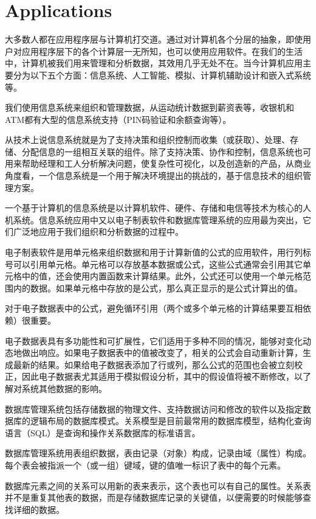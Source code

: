 \part{Applications}

大多数人都在应用程序层与计算机打交道。通过对计算机各个分层的抽象，即使用户对应用程序层下的各个计算层一无所知，也可以使用应用软件。在我们的生活中，计算机被我们用来管理和分析数据，其效用几乎无处不在。当今计算机应用主要分为以下五个方面：信息系统、人工智能、模拟、计算机辅助设计和嵌入式系统等。

我们使用信息系统来组织和管理数据，从运动统计数据到薪资表等，收银机和ATM都有大型的信息系统支持（PIN码验证和余额查询等）。

从技术上说信息系统就是为了支持决策和组织控制而收集（或获取）、处理、存储、分配信息的一组相互关联的组件。除了支持决策、协作和控制，信息系统也可用来帮助经理和工人分析解决问题，使复杂性可视化，以及创造新的产品，从商业角度看，一个信息系统是一个用于解决环境提出的挑战的，基于信息技术的组织管理方案。

一个基于计算机的信息系统是以计算机软件、硬件、存储和电信等技术为核心的人机系统。信息系统应用中又以电子制表软件和数据库管理系统的应用最为突出，它们广泛地应用于我们组织和分析数据的过程中。

电子制表软件是用单元格来组织数据和用于计算新值的公式的应用软件，用行列标号可以引用单元格。单元格可以存放基本数据或公式，这些公式通常会引用其它单元格中的值，还会使用内置函数来计算结果。此外，公式还可以使用一个单元格范围内的数据。如果单元格中存放的是公式，那么真正显示的是公式计算出的值。

对于电子数据表中的公式，避免循环引用（两个或多个单元格的计算结果要互相依赖）很重要。

电子数据表具有多功能性和可扩展性，它们适用于多种不同的情况，能够对变化动态地做出响应。如果电子数据表中的值被改变了，相关的公式会自动重新计算，生成最新的结果。如果给电子数据表添加了行或列，那么公式的范围也会被立刻校正，因此电子数据表尤其适用于模拟假设分析，其中的假设值将被不断修改，以了解对系统其他数据的影响。

数据库管理系统包括存储数据的物理文件、支持数据访问和修改的软件以及指定数据库的逻辑布局的数据库模式。关系模型是目前最常用的数据库模型，结构化查询语言（SQL）是查询和操作关系数据库的标准语言。

数据库管理系统用表组织数据，表由记录（对象）构成，记录由域（属性）构成。每个表会被指派一个（或一组）键域，键的值唯一标识了表中的每个元素。

数据库元素之间的关系可以用新的表来表示，这个表也可以有自己的属性。关系表并不是重复其他表的数据，而是存储数据库记录的关键值，以便需要的时候能够查找详细的数据。

